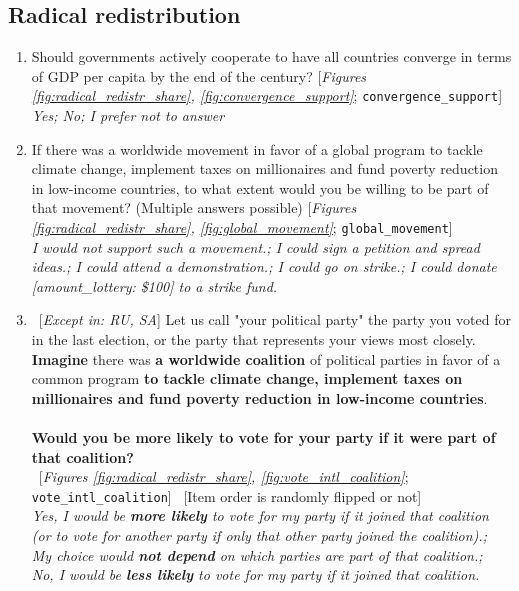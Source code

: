  \subsection*{Radical redistribution} 
 \begin{enumerate}[resume] 
\item  \label{q:convergence_support} Should governments actively cooperate to have all countries converge in terms of GDP per capita by the end of the century? [\textit{Figures \ref{fig:radical_redistr_share}, \ref{fig:convergence_support}}; 
\verb|convergence_support|]
  \\ \textit{Yes; No; I prefer not to answer}

\item  \label{q:global_movement} If there was a worldwide movement in favor of a global program to tackle climate change, implement taxes on millionaires and fund poverty reduction in low-income countries, to what extent would you be willing to be part of that movement? (Multiple answers possible) [\textit{Figures \ref{fig:radical_redistr_share}, \ref{fig:global_movement}}; 
\verb|global_movement|]
  \\ \textit{I would \textit{not} support such a movement.; I could sign a petition and spread ideas.; I could attend a demonstration.; I could go on strike.; I could donate [amount\_lottery: \$100] to a strike fund.}

\item ~[\textit{Except in: RU, SA}] \label{q:vote_intl_coalition} Let us call "your political party" the party you voted for in the last election, or the party that represents your views most closely.~\\\textbf{Imagine }there was \textbf{a worldwide coalition} of political parties in favor of a common program \textbf{to tackle climate change, implement taxes on millionaires and fund poverty reduction in low-income countries}.~\\\\\textbf{Would you be more likely %
to vote for your party if it were part of that coalition?}\\ 
~[\textit{Figures \ref{fig:radical_redistr_share}, \ref{fig:vote_intl_coalition}}; 
\verb|vote_intl_coalition|]
~[Item order is randomly flipped or not]
  \\ \textit{Yes, I would be \textbf{more likely} to vote for my party if it joined that coalition (or to vote for another party if only that other party joined the coalition).; \\My choice would \textbf{not depend} on which parties are part of that coalition.; \\No, I would be \textbf{less likely} to vote for my party if it joined that coalition.}


\end{enumerate}
